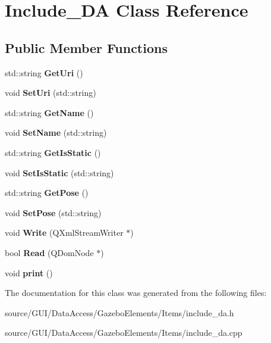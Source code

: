\section{Include\+\_\+\+DA Class Reference}
\label{class_include___d_a}
\subsection*{Public Member Functions}
\begin{DoxyCompactItemize}
\item 
std\+::string {\bfseries Get\+Uri} ()\label{class_include___d_a_a716a86fbde976810dcef44990e65495c}

\item 
void {\bfseries Set\+Uri} (std\+::string)\label{class_include___d_a_a8ef15b8e02198d54eaa071140218a3ee}

\item 
std\+::string {\bfseries Get\+Name} ()\label{class_include___d_a_a7bef19f7ca210d6547e4cb4b739a5dbb}

\item 
void {\bfseries Set\+Name} (std\+::string)\label{class_include___d_a_a40cb7098919d1b724a5ab30eaf9d8c0c}

\item 
std\+::string {\bfseries Get\+Is\+Static} ()\label{class_include___d_a_a1942f84aad67d55311dbfb447dcdc762}

\item 
void {\bfseries Set\+Is\+Static} (std\+::string)\label{class_include___d_a_a394ce61310cbc9d7b92263a369c1992a}

\item 
std\+::string {\bfseries Get\+Pose} ()\label{class_include___d_a_a8f131b0591059cad0ab213b7f0228931}

\item 
void {\bfseries Set\+Pose} (std\+::string)\label{class_include___d_a_a37d64930e7a74a0056047b8ec94e5f34}

\item 
void {\bfseries Write} (Q\+Xml\+Stream\+Writer $\ast$)\label{class_include___d_a_a58d311ce20ca469389dec74caffa5898}

\item 
bool {\bfseries Read} (Q\+Dom\+Node $\ast$)\label{class_include___d_a_ab2eee302c0a569e93cec43f0dca0d666}

\item 
void {\bfseries print} ()\label{class_include___d_a_ae5ea05c08503e7bc21c6de704f5b177e}

\end{DoxyCompactItemize}


The documentation for this class was generated from the following files\+:\begin{DoxyCompactItemize}
\item 
source/\+G\+U\+I/\+Data\+Access/\+Gazebo\+Elements/\+Items/include\+\_\+da.\+h\item 
source/\+G\+U\+I/\+Data\+Access/\+Gazebo\+Elements/\+Items/include\+\_\+da.\+cpp\end{DoxyCompactItemize}

